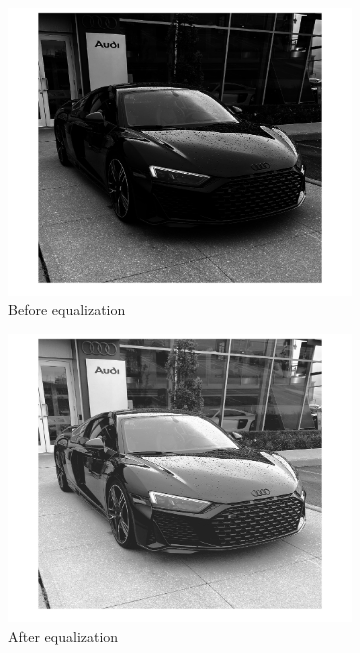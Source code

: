 \documentclass[conference]{IEEEtran}
\begin{document}
\begin{figure}[h!]
\centering
\begin{subfigure}[b]{0.4\linewidth}
\includegraphics[width=\linewidth]{images/img3.jpg}
\caption{Before equalization}
\end{subfigure}
\begin{subfigure}[b]{0.4\linewidth}
\includegraphics[width=\linewidth]{images/img20.jpg}
\caption{After equalization}
\end{subfigure}
\begin{subfigure}[b]{0.4\linewidth}

\end{subfigure}
\end{figure}
\end{document}
